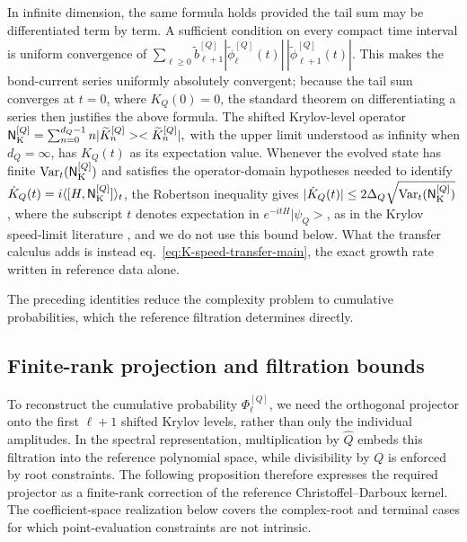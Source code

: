 \documentclass[a4paper,11pt]{article}
\def\ket#1{|#1>}%
\def\bra#1{<#1|}%
\def\ii{i}%
\def\ee{e}%
\theoremstyle{definition}
\theoremstyle{remark}
\newcommand{\ket}[1]{|#1\rangle}
\newcommand{\bra}[1]{\langle #1|}
\newcommand{\ii}{\mathrm i}
\newcommand{\ee}{\mathrm e}
\newcommand{\tphi}{\widetilde\phi}
\newcommand{\Qhat}{\widehat Q}
\begin{document}
In infinite dimension, the same formula holds provided the tail sum may be differentiated term by term.  A sufficient condition on every compact time interval is uniform convergence of $\sum_{\ell\ge0}\widetilde b_{\ell+1}^{[Q]}|\tphi_\ell^{[Q]}(t)|\,|\tphi_{\ell+1}^{[Q]}(t)|$.  This makes the bond-current series uniformly absolutely convergent; because the tail sum converges at $t=0$, where $K_Q(0)=0$, the standard theorem on differentiating a series then justifies the above formula.
The shifted Krylov-level operator
$
   \mathsf N_{\rm K}^{[Q]}
   =
   \sum_{n=0}^{d_Q-1}
   n\ket{\widetilde K_n^{[Q]}}
   \bra{\widetilde K_n^{[Q]}},
$
with the upper limit understood as infinity when $d_Q=\infty$, has $K_Q(t)$ as its expectation
value. Whenever the evolved state has finite $\operatorname{Var}_t(\mathsf N_{\rm K}^{[Q]})$ and satisfies the operator-domain hypotheses needed to identify $\dot K_Q(t)=\ii\langle[H,\mathsf N_{\rm K}^{[Q]}]\rangle_t$, the Robertson inequality gives $|\dot K_Q(t)|\le 2\Delta_Q\sqrt{\operatorname{Var}_t(\mathsf N_{\rm K}^{[Q]})}$, where the subscript $t$ denotes expectation in $\ee^{-\ii tH}\ket{\psi_Q}$, as in the Krylov speed-limit literature \cite{DeffnerCampbell2017,Hornedal2022,GillSarkar2024}, and we do not use this bound below. What the
transfer calculus adds is instead eq.~\eqref{eq:K-speed-transfer-main}, the exact growth rate
written in reference data alone.

The preceding identities reduce the complexity problem to cumulative probabilities, which the reference filtration determines directly.

\subsection{Finite-rank projection and filtration bounds}
\label{subsec:projection-filtration}

To reconstruct the cumulative probability $\Phi_\ell^{[Q]}$, we need the orthogonal projector onto
the first $\ell+1$ shifted Krylov levels, rather than only the individual amplitudes. In the
spectral representation, multiplication by $\Qhat$ embeds this filtration into the reference
polynomial space, while divisibility by $Q$ is enforced by root constraints. The following
proposition therefore expresses the required projector as a finite-rank correction of the
reference Christoffel--Darboux kernel. The coefficient-space realization below covers the complex-root
and terminal cases for which point-evaluation constraints are not intrinsic.
\end{document}
